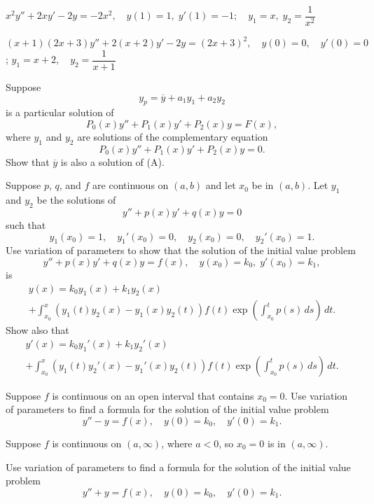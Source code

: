 \begin{exerciselist}
\item\label{exer:5.7.34}\CGex
$x^2y''+2xy'-2y=-2x^2, \quad   y(1)=1,\;  y'(1)=
-1; \quad  y_1=x,\;  y_2=\dfrac{1}{x^2}$

\item\label{exer:5.7.35}\CGex
$(x+1)(2x+3)y''+2(x+2)y'-2y=(2x+3)^2, \quad  y(0)=0,\quad y'(0)=0$;
\newline $y_1=x+2,\quad y_2=\dfrac{1}{x+1}$

\item\label{exer:5.7.36}Suppose
\[
y_p=\overline y+a_1y_1+a_2y_2
\]
is a particular solution of
\[
P_0(x)y''+P_1(x)y'+P_2(x)y=F(x),
\tag{A}
\]
where  $y_1$  and $y_2$ are  solutions of the complementary equation
\[
P_0(x)y''+P_1(x)y'+P_2(x)y=0.
\]
Show that $\overline y$  is also a solution of  (A).

\item\label{exer:5.7.37}Suppose $p$,  $q$, and $f$ are continuous
on $(a,b)$ and let $x_0$ be in $(a,b)$. Let
$y_1$ and $y_2$ be the  solutions of
\[
y''+p(x)y'+q(x)y=0
\]
such that
\[
y_1(x_0)=1, \quad y_1'(x_0)=0, \quad y_2(x_0)=0, \quad
y_2'(x_0)=1.
\]
Use variation of parameters to show that the solution of the initial
value problem
\[
y''+p(x)y'+q(x)y=f(x), \quad   y(x_0)=k_0,\;  y'(x_0)=k_1,
\]
is
\begin{multline*}
y(x) = k_0y_1(x)+k_1y_2(x) \\
+\int^x_{x_0}\left(y_1(t)y_2(x)-y_1(x)y_2(t)\right)
f(t)\exp\left(\int^t_{x_0}p(s)\,ds\right)\,dt.
\end{multline*}
 Show also that
\begin{multline*}
y'(x) = k_0y_1'(x)+k_1y_2'(x) \\
+\int^x_{x_0}\left(y_1(t)y_2'(x)-y_1'(x)y_2(t)\right)
f(t)\exp\left(\int^t_{x_0}p(s)\,ds\right)\,dt.
\end{multline*}

\item\label{exer:5.7.38}Suppose $f$ is continuous on an open interval
that contains $x_0=0$.
Use variation of parameters to
find a formula for the solution of the initial value problem
\[
y''-y=f(x), \quad  y(0)=k_0,\quad y'(0)=k_1.
\]

\item\label{exer:5.7.39}Suppose $f$ is continuous on
$(a,\infty)$, where $a<0$, so $x_0=0$ is in $(a,\infty)$.

\begin{alist}
\item %
Use variation of parameters to
find a formula for the solution of the initial value problem
\[
y''+y=f(x), \quad  y(0)=k_0,\quad y'(0)=k_1.
\]
\end{alist}


\end{exerciselist}
